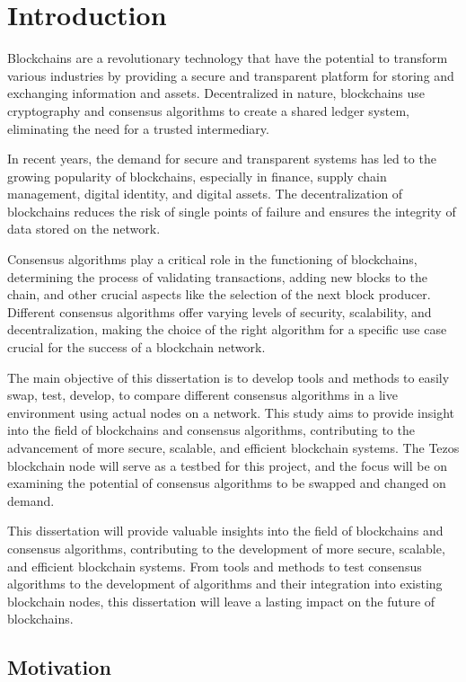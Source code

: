 \chapter{Introduction}
\label{chap:int}


Blockchains are a revolutionary technology that have the potential to transform various industries by providing a secure and transparent platform for storing and exchanging information and assets. Decentralized in nature, blockchains use cryptography and consensus algorithms to create a shared ledger system, eliminating the need for a trusted intermediary.

In recent years, the demand for secure and transparent systems has led to the growing popularity of blockchains, especially in finance, supply chain management, digital identity, and digital assets. The decentralization of blockchains reduces the risk of single points of failure and ensures the integrity of data stored on the network.

Consensus algorithms play a critical role in the functioning of blockchains, determining the process of validating transactions, adding new blocks to the chain, and other crucial aspects like the selection of the next block producer. Different consensus algorithms offer varying levels of security, scalability, and decentralization, making the choice of the right algorithm for a specific use case crucial for the success of a blockchain network.


The main objective of this dissertation is to develop tools and methods to easily swap, test, develop, to compare different consensus algorithms in a live environment using actual nodes on a network. This study aims to provide insight into the field of blockchains and consensus algorithms, contributing to the advancement of more secure, scalable, and efficient blockchain systems. The Tezos \cite{goodman2014tezos} blockchain node will serve as a testbed for this project, and the focus will be on examining the potential of consensus algorithms to be swapped and changed on demand.

This dissertation will provide valuable insights into the field of blockchains and consensus algorithms, contributing to the development of more secure, scalable, and efficient blockchain systems. From tools and methods to test consensus algorithms to the development of algorithms and their integration into existing blockchain nodes, this dissertation will leave a lasting impact on the future of blockchains.

\section*{Motivation}

